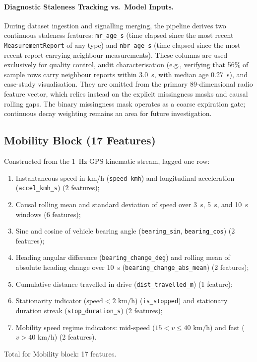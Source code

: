 \paragraph{Diagnostic Staleness Tracking vs.\ Model Inputs.}
During dataset ingestion and signalling merging, the pipeline derives two continuous staleness features: \texttt{mr\_age\_s} (time elapsed since the most recent \texttt{MeasurementReport} of any type) and \texttt{nbr\_age\_s} (time elapsed since the most recent report carrying neighbour measurements). These columns are used exclusively for quality control, audit characterisation (e.g., verifying that 56\% of sample rows carry neighbour reports within 3.0~s, with median age 0.27~s), and case-study visualisation. They are omitted from the primary 89-dimensional radio feature vector, which relies instead on the explicit missingness masks and causal rolling gaps. The binary missingness mask operates as a coarse expiration gate; continuous decay weighting remains an area for future investigation.

\subsection{Mobility Block (17 Features)}
Constructed from the 1~Hz GPS kinematic stream, lagged one row:
\begin{enumerate}
    \item Instantaneous speed in km/h (\texttt{speed\_kmh}) and longitudinal acceleration (\texttt{accel\_kmh\_s}) (2 features);
    \item Causal rolling mean and standard deviation of speed over 3~s, 5~s, and 10~s windows (6 features);
    \item Sine and cosine of vehicle bearing angle (\texttt{bearing\_sin}, \texttt{bearing\_cos}) (2 features);
    \item Heading angular difference (\texttt{bearing\_change\_deg}) and rolling mean of absolute heading change over 10~s (\texttt{bearing\_change\_}\allowbreak\texttt{abs\_mean}) (2 features);
    \item Cumulative distance travelled in drive (\texttt{dist\_travelled\_m}) (1 feature);
    \item Stationarity indicator ($\text{speed} < 2\text{ km/h}$) (\texttt{is\_stopped}) and stationary duration streak (\texttt{stop\_duration\_s}) (2 features);
    \item Mobility speed regime indicators: mid-speed ($15 < v \le 40\text{ km/h}$) and fast ($v > 40\text{ km/h}$) (2 features).
\end{enumerate}
Total for Mobility block: 17 features.

